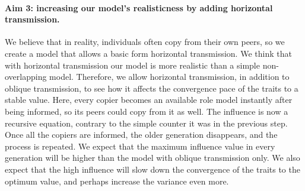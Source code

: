\documentclass[11pt]{article}
\begin{document}
 \paragraph*{Aim 3: increasing our model's realisticness by adding horizontal transmission.}\label{horizontal model}
 We believe that in reality, individuals often copy from their own peers, so we create a model that allows a basic form horizontal transmission.
 We think that with horizontal transmission our model is more realistic than a simple non-overlapping model.
 Therefore, we allow horizontal transmission, in addition to oblique transmission, to see how it affects the convergence pace of the traits to a stable value. %
  Here, every copier becomes an available role model instantly after being informed, so its peers could copy from it as well. %
  The influence is now a recursive equation, contrary to the simple counter it was in the previous step. %
  Once all the copiers are informed, the older generation disappears, and the process is repeated. %
  We expect that the maximum influence value in every generation will be higher than the model with oblique transmission only.
  We also expect that the high influence will slow down the convergence of the traits to the optimum value, and perhaps increase the variance even more. 
 
\end{document}
